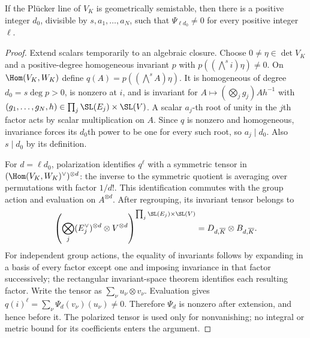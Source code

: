 \begin{lemma}
\label{lem:contraction-nonzero}
\notready
If the Pl\"ucker line of $V_K$ is geometrically semistable, then there
is a positive integer $d_0$, divisible by $s,a_1,\ldots,a_N$, such
that $\Psi_{\ell d_0}\ne0$ for every positive integer $\ell$.
\end{lemma}
\begin{proof}
Extend scalars temporarily to an algebraic closure. Choose
$0\ne\eta\in\det V_K$ and a positive-degree homogeneous invariant
$p$ with $p((\bigwedge^s i)\eta)\ne0$. On $\Hom(V_K,W_K)$ define
$q(A)=p((\bigwedge^s A)\eta)$. It is homogeneous of degree
$d_0=s\deg p>0$, is nonzero at $i$, and is invariant for
$A\mapsto(\bigotimes_jg_j)Ah^{-1}$ with
$(g_1,\ldots,g_N,h)\in\prod_j\SL(E_j)\times\SL(V)$.
A scalar $a_j$-th root of unity in the $j$th factor acts by scalar
multiplication on $A$. Since $q$ is nonzero and homogeneous, invariance
forces its $d_0$th power to be one for every such root, so $a_j\mid d_0$.
Also $s\mid d_0$ by its definition.

For $d=\ell d_0$, polarization identifies $q^\ell$ with a symmetric
tensor in $(\Hom(V_K,W_K)^\vee)^{\otimes d}$: the inverse to the
symmetric quotient is averaging over permutations with factor $1/d!$.
This identification commutes with the group action and evaluation on
$A^{\otimes d}$. After regrouping, its invariant tensor belongs to
\[
 \left(\bigotimes_j(E_j^\vee)^{\otimes d}\otimes V^{\otimes d}\right)
 ^{\prod_j\SL(E_j)\times\SL(V)}=D_{d,\overline K}\otimes B_{d,\overline K}.
\]
For independent group actions, the equality of invariants follows by
expanding in a basis of every factor except one and imposing invariance
in that factor successively; the rectangular invariant-space theorem
identifies each resulting factor. Write the tensor as
$\sum_\nu u_\nu\otimes v_\nu$. Evaluation gives
$q(i)^\ell=\sum_\nu\Psi_d(v_\nu)(u_\nu)\ne0$.
Therefore $\Psi_d$ is nonzero after extension, and hence before it.
The polarized tensor is used only for nonvanishing; no integral or
metric bound for its coefficients enters the argument.
\end{proof}

